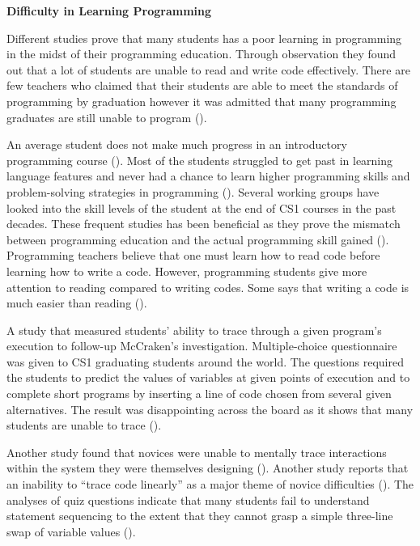 \flushleft
\textbf{Difficulty in Learning Programming}\\
\justifying

\parx
Different studies prove that many students has a poor learning in programming in the
midst of their programming education. Through observation they found out that a lot of
students are unable to read and write code effectively. There are few teachers who
claimed that their students are able to meet the standards of programming by graduation
however it was admitted that many programming graduates are still unable to program
(\cite{carter_and_jenkins}).

\parx
An average student does not make much progress in an introductory programming course
(\cite{robins_2003}). Most of the students struggled to get past in learning language
features and never had a chance to learn higher programming skills and problem-solving
strategies in programming (\cite{linn_dalbey}). Several working groups have looked into
the skill levels of the student at the end of CS1 courses in the past decades. These
frequent studies has been beneficial as they prove the mismatch between programming
education and the actual programming skill gained (\cite{mccraken_2001}). Programming
teachers believe that one must learn how to read code before learning how to write
a code. However, programming students give more attention to reading compared to writing
codes. Some says that writing a code is much easier than reading
(\cite{lister_2009}).

\parx
A study that measured students’ ability to trace through a given program’s
execution to follow-up McCraken's investigation. Multiple-choice questionnaire was given
to CS1 graduating students around the world. The questions required the students  to
predict the values of variables at given points of execution and to complete short
programs by inserting a line of code chosen from several given alternatives. The result
was disappointing across the board as it shows that many students are unable to trace
(\cite{lister_2004}).

\parx
Another study found that novices were unable to mentally trace interactions within the
system they were themselves designing (\cite{adelson_soloway}). Another study reports
that an inability to “trace code linearly” as a major theme of novice difficulties
(\cite{kaczmarczyk}). The analyses of quiz questions indicate that many students fail to
understand statement sequencing to the extent that they cannot grasp a simple three-line
swap of variable values (\cite{corney_2011}).
